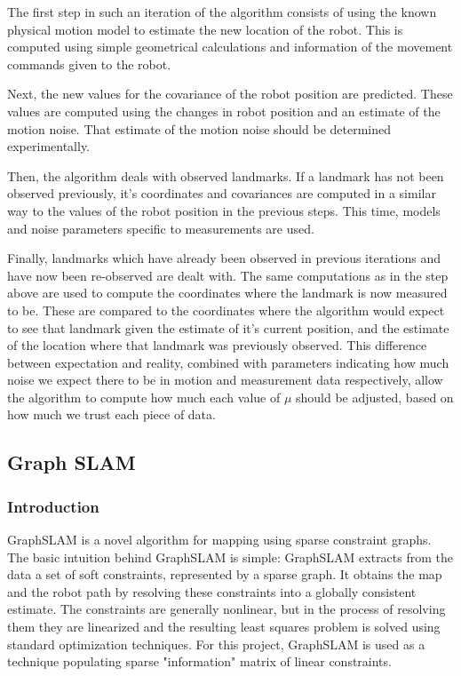 \documentclass{ba-kecs}
\numberwithin{figure}{section}
\numberwithin{equation}{section}
\begin{document}
The first step in such an iteration of the algorithm consists of using the known physical motion model to estimate the new location of the robot. This is computed using simple geometrical calculations and information of the movement commands given to the robot.

Next, the new values for the covariance of the robot position are predicted. These values are computed using the changes in robot position and an estimate of the motion noise. That estimate of the motion noise should be determined experimentally.

Then, the algorithm deals with observed landmarks. If a landmark has not been observed previously, it’s coordinates and covariances are computed in a similar way to the values of the robot position in the previous steps. This time, models and noise parameters specific to measurements are used.

Finally, landmarks which have already been observed in previous iterations and have now been re-observed are dealt with. The same computations as in the step above are used to compute the coordinates where the landmark is now measured to be. These are compared to the coordinates where the algorithm would expect to see that landmark given the estimate of it’s current position, and the estimate of the location where that landmark was previously observed. This difference between expectation and reality, combined with parameters indicating how much noise we expect there to be in motion and measurement data respectively, allow the algorithm to compute how much each value of $\mu$ should be adjusted, based on how much we trust each piece of data.

\subsection{Graph SLAM}

\subsubsection{Introduction}
GraphSLAM is a novel algorithm for mapping using sparse constraint graphs. The basic intuition behind GraphSLAM is simple: GraphSLAM extracts from the data a set of soft constraints, represented by a sparse graph. It obtains the map and the robot path by resolving these constraints into a globally consistent estimate. The constraints are generally nonlinear, but in the process of resolving them they are linearized and the resulting least squares problem is solved using standard optimization techniques\cite{sik}. For this project, GraphSLAM is used as a technique populating sparse "information" matrix of linear constraints.
\end{document}
